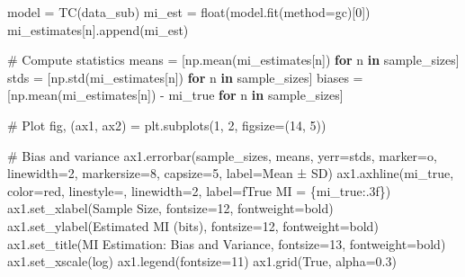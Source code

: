 \documentclass[
  11pt,
  letterpaper,
  oneside,
  openany]{book}
\newenvironment{Shaded}{\begin{snugshade}}{\end{snugshade}}
\newcommand{\BuiltInTok}[1]{\textcolor[rgb]{0.00,0.23,0.31}{#1}}
\newcommand{\CommentTok}[1]{\textcolor[rgb]{0.37,0.37,0.37}{#1}}
\newcommand{\ControlFlowTok}[1]{\textcolor[rgb]{0.00,0.23,0.31}{\textbf{#1}}}
\newcommand{\DecValTok}[1]{\textcolor[rgb]{0.68,0.00,0.00}{#1}}
\newcommand{\FloatTok}[1]{\textcolor[rgb]{0.68,0.00,0.00}{#1}}
\newcommand{\KeywordTok}[1]{\textcolor[rgb]{0.00,0.23,0.31}{\textbf{#1}}}
\newcommand{\NormalTok}[1]{\textcolor[rgb]{0.00,0.23,0.31}{#1}}
\newcommand{\OperatorTok}[1]{\textcolor[rgb]{0.37,0.37,0.37}{#1}}
\newcommand{\SpecialCharTok}[1]{\textcolor[rgb]{0.37,0.37,0.37}{#1}}
\newcommand{\SpecialStringTok}[1]{\textcolor[rgb]{0.13,0.47,0.30}{#1}}
\newcommand{\StringTok}[1]{\textcolor[rgb]{0.13,0.47,0.30}{#1}}
\newcommand{\VariableTok}[1]{\textcolor[rgb]{0.07,0.07,0.07}{#1}}
\begin{document}
\begin{Shaded}
\begin{Highlighting}[]
\NormalTok{        model }\OperatorTok{=}\NormalTok{ TC(data\_sub)}
\NormalTok{        mi\_est }\OperatorTok{=} \BuiltInTok{float}\NormalTok{(model.fit(method}\OperatorTok{=}\StringTok{\textquotesingle{}gc\textquotesingle{}}\NormalTok{)[}\DecValTok{0}\NormalTok{])}
\NormalTok{        mi\_estimates[n].append(mi\_est)}

\CommentTok{\# Compute statistics}
\NormalTok{means }\OperatorTok{=}\NormalTok{ [np.mean(mi\_estimates[n]) }\ControlFlowTok{for}\NormalTok{ n }\KeywordTok{in}\NormalTok{ sample\_sizes]}
\NormalTok{stds }\OperatorTok{=}\NormalTok{ [np.std(mi\_estimates[n]) }\ControlFlowTok{for}\NormalTok{ n }\KeywordTok{in}\NormalTok{ sample\_sizes]}
\NormalTok{biases }\OperatorTok{=}\NormalTok{ [np.mean(mi\_estimates[n]) }\OperatorTok{{-}}\NormalTok{ mi\_true }\ControlFlowTok{for}\NormalTok{ n }\KeywordTok{in}\NormalTok{ sample\_sizes]}

\CommentTok{\# Plot}
\NormalTok{fig, (ax1, ax2) }\OperatorTok{=}\NormalTok{ plt.subplots(}\DecValTok{1}\NormalTok{, }\DecValTok{2}\NormalTok{, figsize}\OperatorTok{=}\NormalTok{(}\DecValTok{14}\NormalTok{, }\DecValTok{5}\NormalTok{))}

\CommentTok{\# Bias and variance}
\NormalTok{ax1.errorbar(sample\_sizes, means, yerr}\OperatorTok{=}\NormalTok{stds, marker}\OperatorTok{=}\StringTok{\textquotesingle{}o\textquotesingle{}}\NormalTok{, linewidth}\OperatorTok{=}\DecValTok{2}\NormalTok{, }
\NormalTok{             markersize}\OperatorTok{=}\DecValTok{8}\NormalTok{, capsize}\OperatorTok{=}\DecValTok{5}\NormalTok{, label}\OperatorTok{=}\StringTok{\textquotesingle{}Mean ± SD\textquotesingle{}}\NormalTok{)}
\NormalTok{ax1.axhline(mi\_true, color}\OperatorTok{=}\StringTok{\textquotesingle{}red\textquotesingle{}}\NormalTok{, linestyle}\OperatorTok{=}\StringTok{\textquotesingle{}{-}{-}\textquotesingle{}}\NormalTok{, linewidth}\OperatorTok{=}\DecValTok{2}\NormalTok{, }
\NormalTok{            label}\OperatorTok{=}\SpecialStringTok{f\textquotesingle{}True MI = }\SpecialCharTok{\{}\NormalTok{mi\_true}\SpecialCharTok{:.3f\}}\SpecialStringTok{\textquotesingle{}}\NormalTok{)}
\NormalTok{ax1.set\_xlabel(}\StringTok{\textquotesingle{}Sample Size\textquotesingle{}}\NormalTok{, fontsize}\OperatorTok{=}\DecValTok{12}\NormalTok{, fontweight}\OperatorTok{=}\StringTok{\textquotesingle{}bold\textquotesingle{}}\NormalTok{)}
\NormalTok{ax1.set\_ylabel(}\StringTok{\textquotesingle{}Estimated MI (bits)\textquotesingle{}}\NormalTok{, fontsize}\OperatorTok{=}\DecValTok{12}\NormalTok{, fontweight}\OperatorTok{=}\StringTok{\textquotesingle{}bold\textquotesingle{}}\NormalTok{)}
\NormalTok{ax1.set\_title(}\StringTok{\textquotesingle{}MI Estimation: Bias and Variance\textquotesingle{}}\NormalTok{, fontsize}\OperatorTok{=}\DecValTok{13}\NormalTok{, fontweight}\OperatorTok{=}\StringTok{\textquotesingle{}bold\textquotesingle{}}\NormalTok{)}
\NormalTok{ax1.set\_xscale(}\StringTok{\textquotesingle{}log\textquotesingle{}}\NormalTok{)}
\NormalTok{ax1.legend(fontsize}\OperatorTok{=}\DecValTok{11}\NormalTok{)}
\NormalTok{ax1.grid(}\VariableTok{True}\NormalTok{, alpha}\OperatorTok{=}\FloatTok{0.3}\NormalTok{)}


\end{Highlighting}
\end{Shaded}
\end{document}
